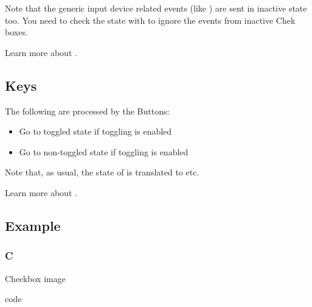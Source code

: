 \documentclass[letterpaper,10pt,english]{sphinxmanual}
\begin{document}
Note that the generic input device related events (like ) are sent in inactive state too. You need to check the state with  to ignore the events from inactive Chek boxes.

Learn more about {\hyperref[\detokenize{overview/events::doc}]{}}.


\subsection{Keys}
\label{\detokenize{object-types/cb:keys}}
The following  are processed by the Buttons:
\begin{itemize}
\item {} 
 Go to toggled state if toggling is enabled

\item {} 
 Go to non-toggled state if toggling is  enabled

\end{itemize}

Note that, as usual, the state of  is translated to  etc.

Learn more about {\hyperref[\detokenize{overview/indev::doc}]{}}.


\subsection{Example}
\label{\detokenize{object-types/cb:example}}

\subsubsection{C}
\label{\detokenize{object-types/cb:c}}
Checkbox image

code
\end{document}
